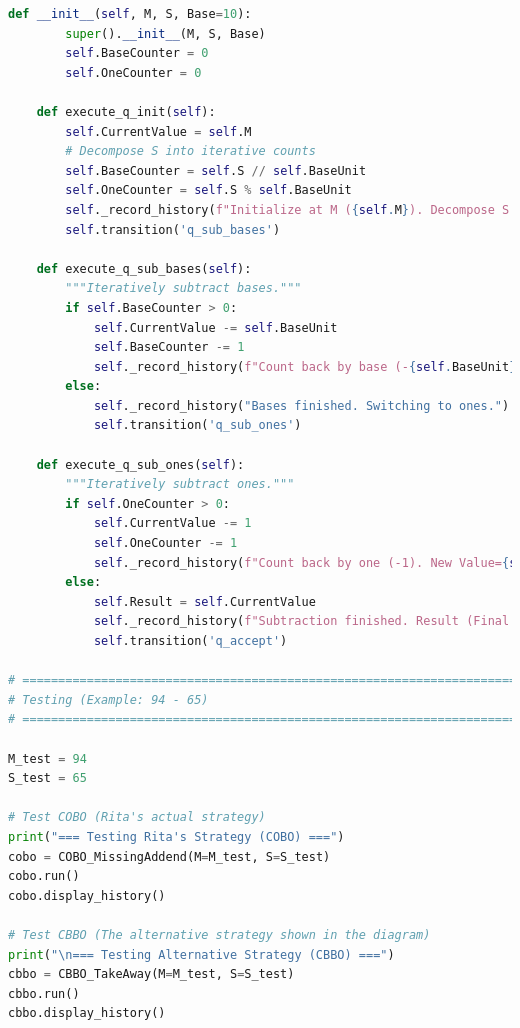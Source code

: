 \documentclass[11pt]{article}
\begin{document}
\begin{lstlisting}[language=Python]
    def __init__(self, M, S, Base=10):
        super().__init__(M, S, Base)
        self.BaseCounter = 0
        self.OneCounter = 0

    def execute_q_init(self):
        self.CurrentValue = self.M
        # Decompose S into iterative counts
        self.BaseCounter = self.S // self.BaseUnit
        self.OneCounter = self.S % self.BaseUnit
        self._record_history(f"Initialize at M ({self.M}). Decompose S ({self.S}): {self.BaseCounter} bases, {self.OneCounter} ones.")
        self.transition('q_sub_bases')

    def execute_q_sub_bases(self):
        """Iteratively subtract bases."""
        if self.BaseCounter > 0:
            self.CurrentValue -= self.BaseUnit
            self.BaseCounter -= 1
            self._record_history(f"Count back by base (-{self.BaseUnit}). New Value={self.CurrentValue}.")
        else:
            self._record_history("Bases finished. Switching to ones.")
            self.transition('q_sub_ones')

    def execute_q_sub_ones(self):
        """Iteratively subtract ones."""
        if self.OneCounter > 0:
            self.CurrentValue -= 1
            self.OneCounter -= 1
            self._record_history(f"Count back by one (-1). New Value={self.CurrentValue}.")
        else:
            self.Result = self.CurrentValue
            self._record_history(f"Subtraction finished. Result (Final Position) = {self.Result}.")
            self.transition('q_accept')

# =============================================================================
# Testing (Example: 94 - 65)
# =============================================================================

M_test = 94
S_test = 65

# Test COBO (Rita's actual strategy)
print("=== Testing Rita's Strategy (COBO) ===")
cobo = COBO_MissingAddend(M=M_test, S=S_test)
cobo.run()
cobo.display_history()

# Test CBBO (The alternative strategy shown in the diagram)
print("\n=== Testing Alternative Strategy (CBBO) ===")
cbbo = CBBO_TakeAway(M=M_test, S=S_test)
cbbo.run()
cbbo.display_history()
\end{lstlisting}

\printbibliography
\end{document}
